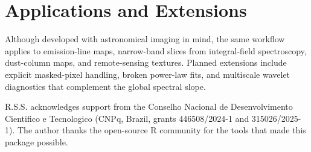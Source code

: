\documentclass[RNAAS]{aastex631}
\begin{document}
\section{Applications and Extensions}

Although developed with astronomical imaging in mind, the same workflow applies to emission-line maps, narrow-band slices from integral-field spectroscopy, dust-column maps, and remote-sensing textures. Planned extensions include explicit masked-pixel handling, broken power-law fits, and multiscale wavelet diagnostics that complement the global spectral slope.

\begin{acknowledgments}
R.S.S. acknowledges support from the Conselho Nacional de Desenvolvimento Cientifico e Tecnologico (CNPq, Brazil, grants 446508/2024-1 and 315026/2025-1). The author thanks the open-source \textsf{R} community for the tools that made this package possible.
\end{acknowledgments}


{}

\end{document}
